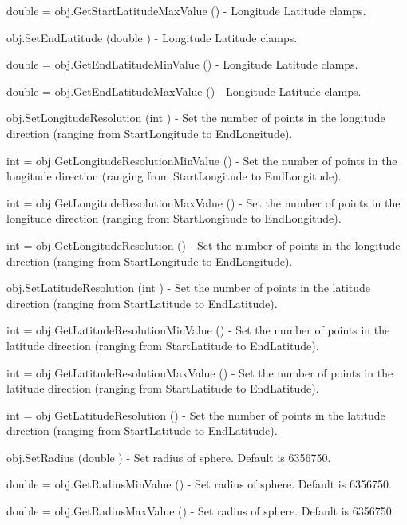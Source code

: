 \begin{DoxyItemize}
\item {\ttfamily double = obj.\-Get\-Start\-Latitude\-Max\-Value ()} -\/ Longitude Latitude clamps.  
\item {\ttfamily obj.\-Set\-End\-Latitude (double )} -\/ Longitude Latitude clamps.  
\item {\ttfamily double = obj.\-Get\-End\-Latitude\-Min\-Value ()} -\/ Longitude Latitude clamps.  
\item {\ttfamily double = obj.\-Get\-End\-Latitude\-Max\-Value ()} -\/ Longitude Latitude clamps.  
\item {\ttfamily obj.\-Set\-Longitude\-Resolution (int )} -\/ Set the number of points in the longitude direction (ranging from Start\-Longitude to End\-Longitude).  
\item {\ttfamily int = obj.\-Get\-Longitude\-Resolution\-Min\-Value ()} -\/ Set the number of points in the longitude direction (ranging from Start\-Longitude to End\-Longitude).  
\item {\ttfamily int = obj.\-Get\-Longitude\-Resolution\-Max\-Value ()} -\/ Set the number of points in the longitude direction (ranging from Start\-Longitude to End\-Longitude).  
\item {\ttfamily int = obj.\-Get\-Longitude\-Resolution ()} -\/ Set the number of points in the longitude direction (ranging from Start\-Longitude to End\-Longitude).  
\item {\ttfamily obj.\-Set\-Latitude\-Resolution (int )} -\/ Set the number of points in the latitude direction (ranging from Start\-Latitude to End\-Latitude).  
\item {\ttfamily int = obj.\-Get\-Latitude\-Resolution\-Min\-Value ()} -\/ Set the number of points in the latitude direction (ranging from Start\-Latitude to End\-Latitude).  
\item {\ttfamily int = obj.\-Get\-Latitude\-Resolution\-Max\-Value ()} -\/ Set the number of points in the latitude direction (ranging from Start\-Latitude to End\-Latitude).  
\item {\ttfamily int = obj.\-Get\-Latitude\-Resolution ()} -\/ Set the number of points in the latitude direction (ranging from Start\-Latitude to End\-Latitude).  
\item {\ttfamily obj.\-Set\-Radius (double )} -\/ Set radius of sphere. Default is 6356750.  
\item {\ttfamily double = obj.\-Get\-Radius\-Min\-Value ()} -\/ Set radius of sphere. Default is 6356750.  
\item {\ttfamily double = obj.\-Get\-Radius\-Max\-Value ()} -\/ Set radius of sphere. Default is 6356750.  

\end{DoxyItemize}
